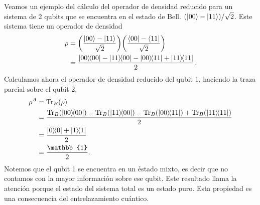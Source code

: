 Veamos un ejemplo del cálculo del operador de densidad reducido
para un sistema de 2 qubits que se encuentra en el estado de Bell.
$\qty(\ket{00}-\ket{11})/\sqrt{2}$. Este
sistema tiene un operador de densidad
\begin{align}
	\rho &= \qty(\frac{\ket{00}-\ket{11}}{\sqrt{2}})
	\qty(\frac{\bra{00}-\bra{11}}{\sqrt{2}}) \\
			 &= \frac{\dyad{00}{00}-\dyad{11}{00}-\dyad{00}{11}+\dyad{11}{11}}{2}.
\end{align}
Calculamos ahora el operador de densidad reducido del qubit 1, haciendo
la traza parcial sobre el qubit 2,
\begin{align}
	\rho^A &= \Tr _B(\rho) \\
			 	 &= \frac{\Tr _B(\dyad{00}{00})-\Tr _B(\dyad{11}{00})
			 	 -\Tr _B(\dyad{00}{11})+\Tr _B(\dyad{11}{11})}{2} \\
			 	 &= \frac{\dyad{0}{0} + \dyad{1}{1}}{2} \\
			 	 &= \frac{\mathbb{1}}{2}.
\end{align}
Notemos que el qubit 1 se encuentra en un \h{estado mixto}, es decir
que no contamos con la mayor información sobre ese qubit. 
Este resultado llama la atención porque el estado del sistema total
es un estado puro. Esta propiedad es una consecuencia
del entrelazamiento cuántico.

